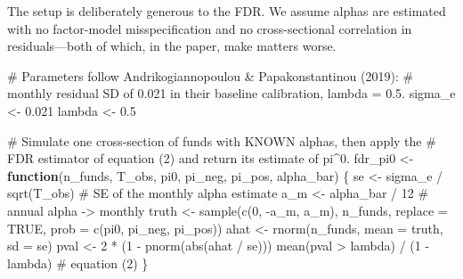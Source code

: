 \documentclass[
  letterpaper,
  DIV=11,
  numbers=noendperiod]{scrartcl}
\newenvironment{Shaded}{\begin{snugshade}}{\end{snugshade}}
\newcommand{\AttributeTok}[1]{\textcolor[rgb]{0.40,0.45,0.13}{#1}}
\newcommand{\CommentTok}[1]{\textcolor[rgb]{0.37,0.37,0.37}{#1}}
\newcommand{\ConstantTok}[1]{\textcolor[rgb]{0.56,0.35,0.01}{#1}}
\newcommand{\ControlFlowTok}[1]{\textcolor[rgb]{0.00,0.23,0.31}{\textbf{#1}}}
\newcommand{\DecValTok}[1]{\textcolor[rgb]{0.68,0.00,0.00}{#1}}
\newcommand{\FloatTok}[1]{\textcolor[rgb]{0.68,0.00,0.00}{#1}}
\newcommand{\FunctionTok}[1]{\textcolor[rgb]{0.28,0.35,0.67}{#1}}
\newcommand{\NormalTok}[1]{\textcolor[rgb]{0.00,0.23,0.31}{#1}}
\newcommand{\OtherTok}[1]{\textcolor[rgb]{0.00,0.23,0.31}{#1}}
\newcommand{\SpecialCharTok}[1]{\textcolor[rgb]{0.37,0.37,0.37}{#1}}
\begin{document}
The setup is deliberately generous to the FDR. We assume alphas are
estimated with no factor-model misspecification and no cross-sectional
correlation in residuals---both of which, in the paper, make matters
worse.

\begin{Shaded}
\begin{Highlighting}[]
\CommentTok{\# Parameters follow Andrikogiannopoulou \& Papakonstantinou (2019):}
\CommentTok{\# monthly residual SD of 0.021 in their baseline calibration, lambda = 0.5.}
\NormalTok{sigma\_e }\OtherTok{\textless{}{-}} \FloatTok{0.021}
\NormalTok{lambda  }\OtherTok{\textless{}{-}} \FloatTok{0.5}

\CommentTok{\# Simulate one cross{-}section of funds with KNOWN alphas, then apply the}
\CommentTok{\# FDR estimator of equation (2) and return its estimate of pi\^{}0.}
\NormalTok{fdr\_pi0 }\OtherTok{\textless{}{-}} \ControlFlowTok{function}\NormalTok{(n\_funds, T\_obs, pi0, pi\_neg, pi\_pos, alpha\_bar) \{}
\NormalTok{  se    }\OtherTok{\textless{}{-}}\NormalTok{ sigma\_e }\SpecialCharTok{/} \FunctionTok{sqrt}\NormalTok{(T\_obs)      }\CommentTok{\# SE of the monthly alpha estimate}
\NormalTok{  a\_m   }\OtherTok{\textless{}{-}}\NormalTok{ alpha\_bar }\SpecialCharTok{/} \DecValTok{12}             \CommentTok{\# annual alpha {-}\textgreater{} monthly}
\NormalTok{  truth }\OtherTok{\textless{}{-}} \FunctionTok{sample}\NormalTok{(}\FunctionTok{c}\NormalTok{(}\DecValTok{0}\NormalTok{, }\SpecialCharTok{{-}}\NormalTok{a\_m, a\_m), n\_funds, }\AttributeTok{replace =} \ConstantTok{TRUE}\NormalTok{,}
                  \AttributeTok{prob =} \FunctionTok{c}\NormalTok{(pi0, pi\_neg, pi\_pos))}
\NormalTok{  ahat  }\OtherTok{\textless{}{-}} \FunctionTok{rnorm}\NormalTok{(n\_funds, }\AttributeTok{mean =}\NormalTok{ truth, }\AttributeTok{sd =}\NormalTok{ se)}
\NormalTok{  pval  }\OtherTok{\textless{}{-}} \DecValTok{2} \SpecialCharTok{*}\NormalTok{ (}\DecValTok{1} \SpecialCharTok{{-}} \FunctionTok{pnorm}\NormalTok{(}\FunctionTok{abs}\NormalTok{(ahat }\SpecialCharTok{/}\NormalTok{ se)))}
  \FunctionTok{mean}\NormalTok{(pval }\SpecialCharTok{\textgreater{}}\NormalTok{ lambda) }\SpecialCharTok{/}\NormalTok{ (}\DecValTok{1} \SpecialCharTok{{-}}\NormalTok{ lambda)  }\CommentTok{\# equation (2)}
\NormalTok{\}}
\end{Highlighting}
\end{Shaded}
\end{document}
